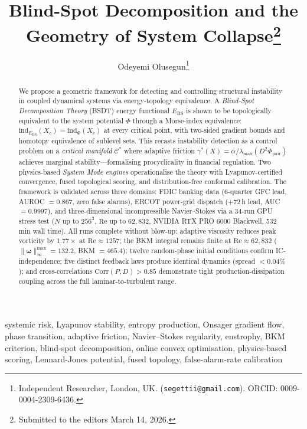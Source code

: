 \documentclass[final]{siamltex}
\title{Blind-Spot Decomposition and the Geometry of System Collapse\thanks{Submitted to the editors March 14, 2026.}}
\author{Odeyemi Olusegun\thanks{Independent Researcher, London, UK.
(\texttt{segettii@gmail.com}).
ORCID: 0009-0004-2309-6436.}}
\newcommand{\Ebs}{E_{\mathrm{BS}}}
\newcommand{\Cman}{\mathcal{C}^*}
\newcommand{\lmax}{\lambda_{\max}}
\begin{document}
\maketitle

\pagestyle{myheadings}
\thispagestyle{plain}

\begin{abstract}
We propose a geometric framework for detecting and controlling
structural instability in coupled dynamical systems via
energy-topology equivalence.
A \emph{Blind-Spot Decomposition Theory} (BSDT) energy functional
\cite{odeyemi2025bsdt} $\Ebs$ is shown to be topologically
equivalent to the system potential $\Phi$ through a Morse-index
equivalence: $\mathrm{ind}_{\Ebs}(X_c) = \mathrm{ind}_\Phi(X_c)$
at every critical point, with two-sided gradient bounds and homotopy
equivalence of sublevel sets.
This recasts instability detection as a control problem on a
\emph{critical manifold} $\Cman$ where adaptive friction
$\gamma^*(X)=\alpha/\lmax(D^2\Phi_{\mathrm{pair}})$ achieves
marginal stability---formalising procyclicality in financial
regulation.
Two physics-based \emph{System Mode engines} operationalise the
theory with Lyapunov-certified convergence, fused topological
scoring, and distribution-free conformal calibration.
The framework is validated across three domains:
FDIC banking data (6-quarter GFC lead, AUROC $= 0.867$,
zero false alarms), ERCOT power-grid dispatch ($+72$\,h lead,
AUC $= 0.9997$), and three-dimensional incompressible
Navier--Stokes via a 34-run GPU stress test
($N$ up to $256^3$, $\mathrm{Re}$ up to $62{,}832$,
NVIDIA RTX PRO 6000 Blackwell, 532\,min wall time).
All runs complete without blow-up: adaptive viscosity
reduces peak vorticity by $1.77\times$ at
$\mathrm{Re}\approx 1257$; the BKM integral remains finite
at $\mathrm{Re}\approx 62{,}832$
($\|\bm{\omega}\|_\infty^{\max}=132.2$, BKM $=465.4$);
twelve random-phase initial conditions confirm IC-independence;
five distinct feedback laws produce identical dynamics
(spread $< 0.04\%$); and cross-correlations
$\mathrm{Corr}(P,D)>0.85$ demonstrate tight
production-dissipation coupling across the full
laminar-to-turbulent range.
\end{abstract}

\begin{keywords}
systemic risk, Lyapunov stability, entropy production, Onsager
gradient flow, phase transition, adaptive friction,
Navier--Stokes regularity, enstrophy, BKM criterion, blind-spot decomposition,
online convex optimisation, physics-based scoring,
Lennard-Jones potential, fused topology,
false-alarm-rate calibration
\end{keywords}
\end{document}
